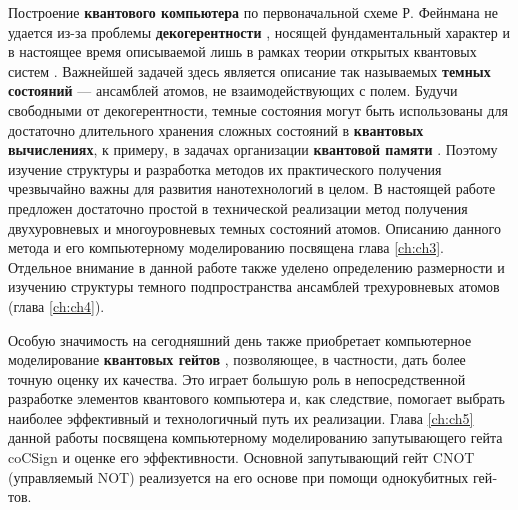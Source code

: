 Построение \textbf{квантового компьютера} по первоначальной схеме Р. Фейнмана \cite{feynman} не удается из-за проблемы \textbf{декогерентности} \cite{fedichkin_2,shor_error_2}, носящей фундаментальный характер и в настоящее время описываемой лишь в рамках теории открытых квантовых систем \cite{breuer}. Важнейшей задачей здесь является описание так называемых \textbf{темных состояний} \cite{kok} --- ансамблей атомов, не взаимодействующих с полем. Будучи свободными от декогерентности, темные состояния могут быть использованы для достаточно длительного хранения сложных состояний в \textbf{квантовых вычислениях}, к примеру, в задачах организации \textbf{квантовой памяти} \cite{using_dark_states}. Поэтому изучение структуры и разра­ботка методов их практического получения чрезвычайно важны для развития нанотехнологий в целом. В настоящей работе предложен достаточно простой в технической реализации метод получения двухуровневых и многоуровневых темных состояний атомов. Описанию данного метода и его компьютерному мо­делированию посвящена глава \ref{ch:ch3}. Отдельное внимание в данной работе также уделено определению размерности и изучению структуры темного подпростран­ства ансамблей трехуровневых атомов (глава \ref{ch:ch4}).

Особую значимость на сегодняшний день также приобретает компьютер­ное моделирование \textbf{квантовых гейтов} \cite{azuma,fault_tolerance_1}, позволяющее, в частности, дать более точную оценку их качества. Это играет большую роль в непосредственной разработке элементов квантового компьютера и, как следствие, помогает выбрать наиболее эффективный и технологичный путь их реализации. Глава \ref{ch:ch5} данной работы посвящена компьютерному моделированию запутывающего гей­та coCSign и оценке его эффективности. Основной запутывающий гейт CNOT (управляемый NOT) реализуется на его основе при помощи однокубитных гей­тов.

